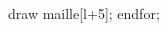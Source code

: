 \begin{exercice*}
\begin{changemargin}{-5mm}{0mm}
\begin{enumerate}
\begin{Geometrie}[CoinHD={(9u,4u)}]
                        draw maille[l+5];
                endfor;            
            \end{Geometrie}
        \end{enumerate}
    \end{changemargin}
\end{exercice*}
